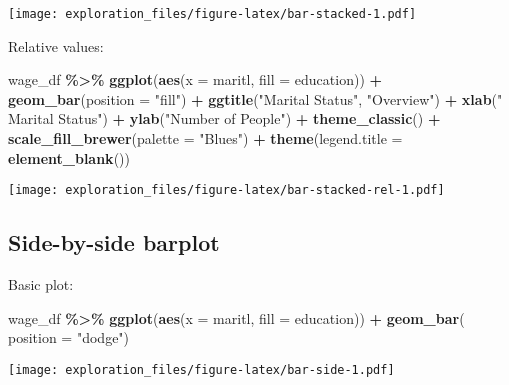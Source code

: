 \documentclass[
]{book}
\newenvironment{Shaded}{\begin{snugshade}}{\end{snugshade}}
\newcommand{\DataTypeTok}[1]{\textcolor[rgb]{0.13,0.29,0.53}{#1}}
\newcommand{\KeywordTok}[1]{\textcolor[rgb]{0.13,0.29,0.53}{\textbf{#1}}}
\newcommand{\NormalTok}[1]{#1}
\newcommand{\OperatorTok}[1]{\textcolor[rgb]{0.81,0.36,0.00}{\textbf{#1}}}
\newcommand{\StringTok}[1]{\textcolor[rgb]{0.31,0.60,0.02}{#1}}
\begin{document}
\texttt{[image: exploration\_files/figure-latex/bar-stacked-1.pdf]}

Relative values:

\begin{Shaded}
\begin{Highlighting}[]
\NormalTok{wage\_df }\OperatorTok{\%\textgreater{}\%}\StringTok{ }
\StringTok{  }\KeywordTok{ggplot}\NormalTok{(}\KeywordTok{aes}\NormalTok{(}\DataTypeTok{x =}\NormalTok{ maritl, }\DataTypeTok{fill =}\NormalTok{ education)) }\OperatorTok{+}
\StringTok{  }\KeywordTok{geom\_bar}\NormalTok{(}\DataTypeTok{position =} \StringTok{"fill"}\NormalTok{) }\OperatorTok{+}
\StringTok{  }\KeywordTok{ggtitle}\NormalTok{(}\StringTok{"Marital Status"}\NormalTok{, }\StringTok{"Overview"}\NormalTok{) }\OperatorTok{+}
\StringTok{  }\KeywordTok{xlab}\NormalTok{(}\StringTok{" Marital Status"}\NormalTok{) }\OperatorTok{+}
\StringTok{  }\KeywordTok{ylab}\NormalTok{(}\StringTok{"Number of People"}\NormalTok{) }\OperatorTok{+}
\StringTok{  }\KeywordTok{theme\_classic}\NormalTok{() }\OperatorTok{+}
\StringTok{  }\KeywordTok{scale\_fill\_brewer}\NormalTok{(}\DataTypeTok{palette =} \StringTok{"Blues"}\NormalTok{) }\OperatorTok{+}
\StringTok{  }\KeywordTok{theme}\NormalTok{(}\DataTypeTok{legend.title =} \KeywordTok{element\_blank}\NormalTok{())}
\end{Highlighting}
\end{Shaded}

\texttt{[image: exploration\_files/figure-latex/bar-stacked-rel-1.pdf]}

\hypertarget{side-by-side-barplot}{%
\subsection{Side-by-side barplot}\label{side-by-side-barplot}}

Basic plot:

\begin{Shaded}
\begin{Highlighting}[]
\NormalTok{wage\_df }\OperatorTok{\%\textgreater{}\%}\StringTok{ }
\StringTok{  }\KeywordTok{ggplot}\NormalTok{(}\KeywordTok{aes}\NormalTok{(}\DataTypeTok{x =}\NormalTok{ maritl, }\DataTypeTok{fill =}\NormalTok{ education)) }\OperatorTok{+}
\StringTok{  }\KeywordTok{geom\_bar}\NormalTok{( }\DataTypeTok{position =} \StringTok{"dodge"}\NormalTok{) }
\end{Highlighting}
\end{Shaded}

\texttt{[image: exploration\_files/figure-latex/bar-side-1.pdf]}
\end{document}
